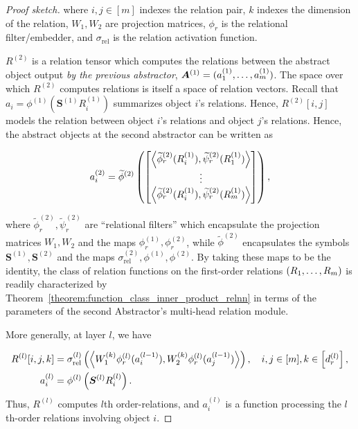 \begin{proof}[Proof sketch]
	where $i,j \in [m]$ indexes the relation pair, $k$ indexes the dimension of the relation, $W_1, W_2$ are projection matrices, $\phi_r$ is the relational filter/embedder, and $\sigma_{\mathrm{rel}}$ is the relation activation function.

	$R^{(2)}$ is a relation tensor which computes the relations between the abstract object output \textit{by the previous abstractor}, $\bm{A}^{(1)} = (a_1^{(1)}, \ldots, a_m^{(1)})$. The space over which $R^{(2)}$ computes relations is itself a space of relation vectors. Recall that $a_i = \phi^{(1)}(\bm{S}^{(1)} R_i^{(1)})$ summarizes object $i$'s relations. Hence, $R^{(2)}[i,j]$ models the relation between object \(i\)'s relations and object \(j\)'s relations. Hence, the abstract objects at the second abstractor can be written as

	\begin{equation*}
		a_i^{(2)} = \tilde{\phi}^{(2)}\left( \begin{bmatrix}
			\left\langle \tilde{\phi}_r^{(2)}(R_i^{(1)}), \tilde{\psi}_r^{(2)}(R_1^{(1)})\right\rangle \\
			\vdots \\
			\left\langle \tilde{\phi}_r^{(2)}(R_i^{(1)}), \tilde{\psi}_r^{(2)}(R_\m^{(1)})\right\rangle
		\end{bmatrix}\right),
	\end{equation*}

	where $\tilde{\phi}_r^{(2)}, \tilde{\psi}_r^{(2)}$ are ``relational filters'' which encapsulate the projection matrices $W_1, W_2$ and the maps $\phi_r^{(1)}, \phi_r^{(2)}$, while $\tilde{\phi}^{(2)}$ encapsulates the symbols $\bm{S}^{(1)}, \bm{S}^{(2)}$ and the maps $\sigma_{\mathrm{rel}}^{(2)}, \phi^{(1)}, \phi^{(2)}$. By taking these maps to be the identity, the class of relation functions on the first-order relations $(R_1, \ldots, R_m)$ is readily characterized by Theorem~\ref{theorem:function_class_inner_product_relnn} in terms of the parameters of the second Abstractor's multi-head relation module.

	More generally, at layer \(l\), we have

	\begin{align*}
		R^{(l)}[i, j, k] &= \sigma_{\mathrm{rel}}^{(l)}\left(\left\langle W_1^{(k)} \phi_r^{(l)}(a_i^{(l-1)}), W_2^{(k)} \phi_r^{(l)}(a_j^{(l-1)}) \right\rangle\right), \quad i,j \in [\m], k \in \left[d_r^{(l)}\right], \\
		a_i^{(l)} &= \phi^{(l)}\left(\bm{S}^{(l)} R_i^{(l)}\right).
	\end{align*}
	Thus, \(R^{(l)}\) computes \(l\)th order-relations, and \(a_i^{(l)}\) is a function processing the \(l\)th-order relations involving object \(i\).
\end{proof}


